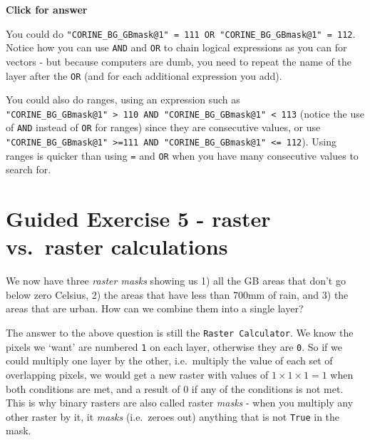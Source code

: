 \documentclass[
  letterpaper,
  DIV=11,
  numbers=noendperiod]{scrreprt}
\begin{document}
\begin{tcolorbox}[enhanced jigsaw, toprule=.15mm, breakable, left=2mm, colframe=quarto-callout-important-color-frame, colback=white, arc=.35mm, leftrule=.75mm, opacityback=0, rightrule=.15mm, bottomrule=.15mm]

\vspace{-3mm}\textbf{Click for answer}\vspace{3mm}

You could do
\texttt{"CORINE\_BG\_GBmask@1"\ =\ 111\ OR\ "CORINE\_BG\_GBmask@1"\ =\ 112}.
Notice how you can use \texttt{AND} and \texttt{OR} to chain logical
expressions as you can for vectors - but because computers are dumb, you
need to repeat the name of the layer after the \texttt{OR} (and for each
additional expression you add).

You could also do ranges, using an expression such as
\texttt{"CORINE\_BG\_GBmask@1"\ \textgreater{}\ 110\ AND\ "CORINE\_BG\_GBmask@1"\ \textless{}\ 113}
(notice the use of \texttt{AND} instead of \texttt{OR} for ranges) since
they are consecutive values, or use
\texttt{"CORINE\_BG\_GBmask@1"\ \textgreater{}=111\ AND\ "CORINE\_BG\_GBmask@1"\ \textless{}=\ 112}).
Using ranges is quicker than using \texttt{=} and \texttt{OR} when you
have many consecutive values to search for.

\end{tcolorbox}

\section{Guided Exercise 5 - raster vs.~raster
calculations}\label{guided-exercise-5---raster-vs.-raster-calculations}

We now have three \emph{raster masks} showing us 1) all the GB areas
that don't go below zero Celsius, 2) the areas that have less than 700mm
of rain, and 3) the areas that are urban. How can we combine them into a
single layer?

The answer to the above question is still the
\texttt{Raster\ Calculator}. We know the pixels we `want' are numbered
\texttt{1} on each layer, otherwise they are \texttt{0}. So if we could
multiply one layer by the other, i.e.~multiply the value of each set of
overlapping pixels, we would get a new raster with values of
\(1 \times 1 \times 1 = 1\) when both conditions are met, and a result
of \(0\) if any of the conditions is not met. This is why binary rasters
are also called raster \emph{masks} - when you multiply any other raster
by it, it \emph{masks} (i.e.~zeroes out) anything that is not
\texttt{True} in the mask.
\end{document}
